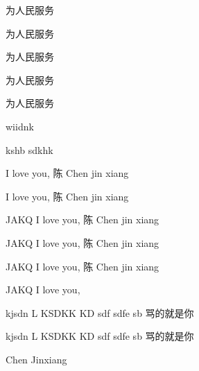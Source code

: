 {\maoti 为人民服务}

{\zhen 为人民服务 }

{\boyang 为人民服务}

{\deng 为人民服务}

{\shou 为人民服务}

{\alex wiidnk } %

{\qianming kshb sdkhk}

{ \Liora I love you, 陈 Chen jin xiang}

{\Timef I love you, 陈 Chen jin xiang }

{\inter JAKQ I love you, 陈 Chen jin xiang}

{\interLi JAKQ I love you, 陈 Chen jin xiang}

{\maple JAKQ I love you, 陈 Chen jin xiang}

JAKQ I love you,

{\ziff kjsdn L KSDKK KD  sdf sdfe sb 骂的就是你}

{\yidali kjsdn L KSDKK KD  sdf sdfe sb 骂的就是你}

{\yidali Chen Jinxiang}

